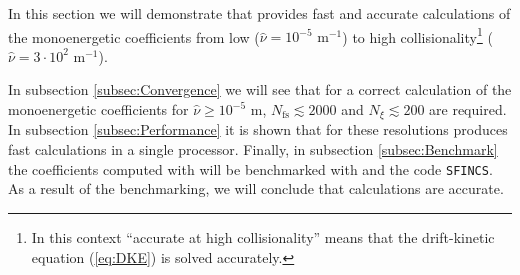 In this section we will demonstrate that {\MONKES} provides fast and accurate calculations of the monoenergetic coefficients from low ($\hat{\nu}=10^{-5}$ $\text{m}^{-1}$) to high collisionality\footnote{In this context ``accurate at high collisionality'' means that the drift-kinetic equation (\ref{eq:DKE}) is solved accurately.} ($\hat{\nu}=3\cdot10^{2}$ $\text{m}^{-1}$).

In subsection \ref{subsec:Convergence} we will see that for a correct calculation of the monoenergetic coefficients for $\hat{\nu}\ge 10^{-5}$ m, $N_{\text{fs}} \lesssim  2000$ and $N_\xi \lesssim 200$ are required. In subsection \ref{subsec:Performance} it is shown that for these resolutions {\MONKES} produces fast calculations in a single processor. Finally, in subsection \ref{subsec:Benchmark} the coefficients computed with {\MONKES} will be benchmarked with {\DKES} and the code {\texttt{SFINCS}}. As a result of the benchmarking, we will conclude that {\MONKES} calculations are accurate. 

 
 
 